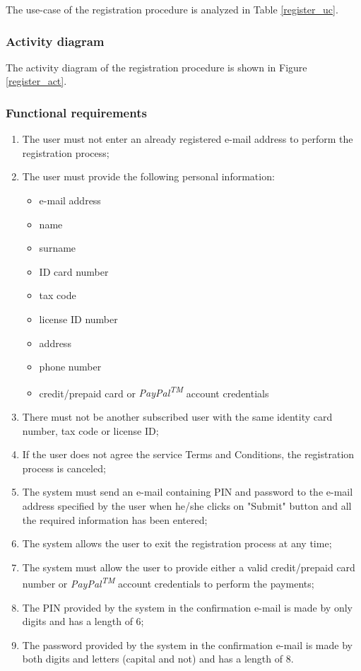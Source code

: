 The use-case of the registration procedure is analyzed in Table \ref{register_uc}.

\subsubsection{Activity diagram}

The activity diagram of the registration procedure is shown in Figure \ref{register_act}.

\subsubsection{Functional requirements}
\begin{enumerate}
\item The user must not enter an already registered e-mail address to perform the registration process;
\item The user must provide the following personal information:
	\begin{itemize}
	\item e-mail address
	\item name
	\item surname
	\item ID card number
	\item tax code
	\item license ID number
	\item address
	\item phone number
	\item credit/prepaid card or \emph{PayPal\textsuperscript{TM}} account credentials
	\end{itemize}
\item There must not be another subscribed user with the same identity card number, tax code or license ID;
\item If the user does not agree the service Terms and Conditions, the registration process is canceled;
\item The system must send an e-mail containing PIN and password to the e-mail address specified by the user when he/she clicks on "Submit" button and all the required information has been entered;
\item The system allows the user to exit the registration process at any time;
\item The system must allow the user to provide either a valid credit/prepaid card number or \emph{PayPal\textsuperscript{TM}} account credentials to perform the payments;
\item The PIN provided by the system in the confirmation e-mail is made by only digits and has a length of 6;
\item The password provided by the system in the confirmation e-mail is made by both digits and letters (capital and not) and has a length of 8.
\end{enumerate}

